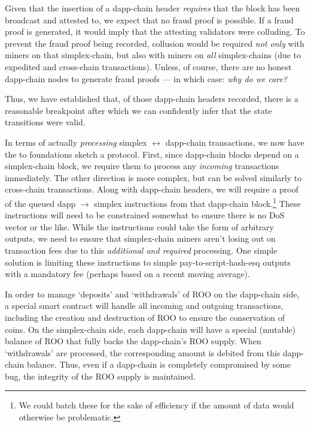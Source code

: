 Given that the insertion of a dapp-chain header \emph{requires} that the block has been broadcast and attested to, we expect that no fraud proof is possible.
If a fraud proof is generated, it would imply that the attesting validators were colluding.
To prevent the fraud proof being recorded, collusion would be required \emph{not only} with miners on that simplex-chain, but also with miners on \emph{all} simplex-chains (due to expedited and cross-chain transactions).
Unless, of course, there are no honest dapp-chain nodes to generate fraud proofs --- in which case: \emph{why do we care?}

Thus, we have established that, of those dapp-chain headers recorded, there is a reasonable breakpoint after which we can confidently infer that the state transitions were valid.

In terms of actually \emph{processing} simplex $\longleftrightarrow$ dapp-chain transactions, we now have the to foundations sketch a protocol.
First, since dapp-chain blocks depend on a simplex-chain block, we require them to process any \emph{incoming} transactions immediately.
The other direction is more complex, but can be solved similarly to cross-chain transactions.
Along with dapp-chain headers, we will require a proof of the queued dapp $\to$ simplex instructions from that dapp-chain block.\footnote{
    We could batch these for the sake of efficiency if the amount of data would otherwise be problematic.
}
These instructions will need to be constrained somewhat to ensure there is no DoS vector or the like.
While the instructions could take the form of arbitrary outputs, we need to ensure that simplex-chain miners aren't losing out on transaction fees due to this \emph{additional and required} processing.
One simple solution is limiting these instructions to simple pay-to-script-hash-esq outputs with a mandatory fee (perhaps based on a recent moving average).

In order to manage `deposits' and `withdrawals' of ROO on the dapp-chain side, a special smart contract will handle all incoming and outgoing transactions, including the creation and destruction of ROO to ensure the conservation of coins.
On the simplex-chain side, each dapp-chain will have a special (mutable) balance of ROO that fully backs the dapp-chain's ROO supply.
When `withdrawals' are processed, the corresponding amount is debited from this dapp-chain balance.
Thus, even if a dapp-chain is completely compromised by some bug, the integrity of the ROO supply is maintained.

